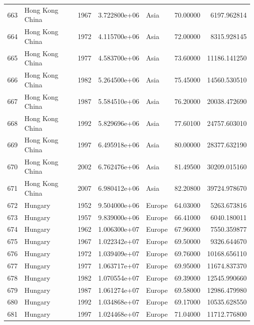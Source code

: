 \documentclass[
  letterpaper,
  DIV=11,
  numbers=noendperiod]{scrreprt}
\begin{document}
\begin{tabular}{llrrlrr}
663  &           Hong Kong China &  1967 &  3.722800e+06 &      Asia &  70.00000 &    6197.962814 \\
664  &           Hong Kong China &  1972 &  4.115700e+06 &      Asia &  72.00000 &    8315.928145 \\
665  &           Hong Kong China &  1977 &  4.583700e+06 &      Asia &  73.60000 &   11186.141250 \\
666  &           Hong Kong China &  1982 &  5.264500e+06 &      Asia &  75.45000 &   14560.530510 \\
667  &           Hong Kong China &  1987 &  5.584510e+06 &      Asia &  76.20000 &   20038.472690 \\
668  &           Hong Kong China &  1992 &  5.829696e+06 &      Asia &  77.60100 &   24757.603010 \\
669  &           Hong Kong China &  1997 &  6.495918e+06 &      Asia &  80.00000 &   28377.632190 \\
670  &           Hong Kong China &  2002 &  6.762476e+06 &      Asia &  81.49500 &   30209.015160 \\
671  &           Hong Kong China &  2007 &  6.980412e+06 &      Asia &  82.20800 &   39724.978670 \\
672  &                   Hungary &  1952 &  9.504000e+06 &    Europe &  64.03000 &    5263.673816 \\
673  &                   Hungary &  1957 &  9.839000e+06 &    Europe &  66.41000 &    6040.180011 \\
674  &                   Hungary &  1962 &  1.006300e+07 &    Europe &  67.96000 &    7550.359877 \\
675  &                   Hungary &  1967 &  1.022342e+07 &    Europe &  69.50000 &    9326.644670 \\
676  &                   Hungary &  1972 &  1.039409e+07 &    Europe &  69.76000 &   10168.656110 \\
677  &                   Hungary &  1977 &  1.063717e+07 &    Europe &  69.95000 &   11674.837370 \\
678  &                   Hungary &  1982 &  1.070554e+07 &    Europe &  69.39000 &   12545.990660 \\
679  &                   Hungary &  1987 &  1.061274e+07 &    Europe &  69.58000 &   12986.479980 \\
680  &                   Hungary &  1992 &  1.034868e+07 &    Europe &  69.17000 &   10535.628550 \\
681  &                   Hungary &  1997 &  1.024468e+07 &    Europe &  71.04000 &   11712.776800 \\

\end{tabular}
\end{document}
